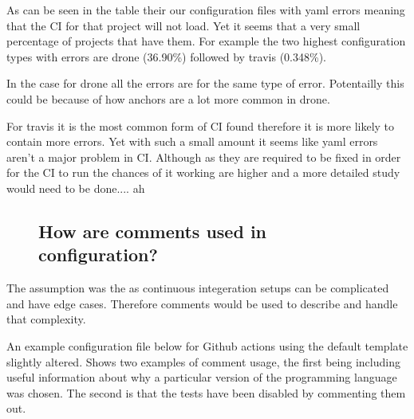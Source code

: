 \documentclass[twoside,12pt,titlepage,a4paper]{article}
\begin{document}


As can be seen in the table their our configuration files with yaml errors meaning that the CI for that project will not load. Yet it seems that a very small percentage of projects that have them. For example the two highest configuration types with errors are drone (36.90\%) followed by travis (0.348\%).

In the case for drone all the errors are for the same type of error. Potentailly this could be because of how anchors are a lot more common in drone.

For travis it is the most common form of CI found therefore it is more likely to contain more errors. Yet with such a small amount it seems like yaml errors aren't a major problem in CI. Although as they are required to be fixed in order for the CI to run the chances of it working are higher and a more detailed study would need to be done.... ah


\pagebreak

\begin{figure}[!ht]
  \vspace*{-0.05in}
  \subsection{How are comments used in configuration?}
  \vspace*{-0.05in}
\end{figure}


The assumption was the as continuous integeration setups can be complicated and have edge cases. Therefore comments would be used to describe and handle that complexity.

An example configuration file below for Github actions using the default template slightly altered. Shows two examples of comment usage, the first being including useful information about why a particular version of the programming language was chosen. The second is that the tests have been disabled by commenting them out. 
\end{document}
